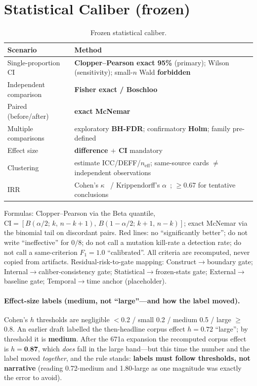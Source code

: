 \documentclass{article}
\begin{document}
\section{Statistical Caliber (frozen)}
\label{app:stats}
\begin{table}[h]
\caption{Frozen statistical caliber.}
\centering
\small
\begin{tabular}{@{}lp{9.5cm}@{}}
\toprule
Scenario & Method \\
\midrule
Single-proportion CI & \textbf{Clopper--Pearson exact 95\%} (primary); Wilson (sensitivity); small-$n$ Wald \textbf{forbidden} \\
Independent comparison & \textbf{Fisher exact / Boschloo} \\
Paired (before/after) & \textbf{exact McNemar} \\
Multiple comparisons & exploratory \textbf{BH-FDR}; confirmatory \textbf{Holm}; family pre-defined \\
Effect size & \textbf{difference $+$ CI} mandatory \\
Clustering & estimate ICC/DEFF/$n_{\text{eff}}$; same-source cards $\neq$ independent observations \\
IRR & Cohen's $\kappa$~\cite{cohen1960coefficient} / Krippendorff's $\alpha$~\cite{krippendorff1980content}; $\ge$0.67 for tentative conclusions \\
\bottomrule
\end{tabular}
\end{table}
Formulas: Clopper--Pearson via the Beta quantile,
$\text{CI}=[B(\alpha/2;\,k,\,n{-}k{+}1),\,B(1{-}\alpha/2;\,k{+}1,\,n{-}k)]$; exact McNemar via the
binomial tail on discordant pairs. Red lines: no ``significantly better''; do not write
``ineffective'' for $0/8$; do not call a mutation kill-rate a detection rate; do not call a
same-criterion $F_1{=}1.0$ ``calibrated''. All criteria are recomputed, never copied from
artifacts. Residual-risk-to-gate mapping: Construct$\to$boundary gate; Internal$\to$caliber-consistency
gate; Statistical$\to$frozen-stats gate; External$\to$baseline gate; Temporal$\to$time anchor (placeholder).

\paragraph{Effect-size labels (\textbf{medium}, not ``large''---and how the label moved).} Cohen's
$h$ thresholds are negligible $<$0.2 / small 0.2 / medium 0.5 / large $\ge$0.8. An earlier draft
labelled the then-headline corpus effect $h=0.72$ ``large''; by threshold it is \textbf{medium}.
After the 671a expansion the recomputed corpus effect is $h=\textbf{0.87}$, which \emph{does} fall
in the large band---but this time the number and the label moved \emph{together}, and the rule
stands: \textbf{labels must follow thresholds, not narrative} (reading 0.72-medium and 1.80-large
as one magnitude was exactly the error to avoid).
\end{document}
